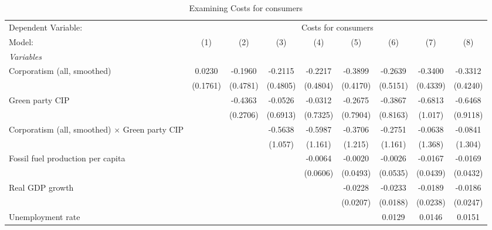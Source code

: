 
\begin{table}[htbp]
   \caption{Examining Costs for consumers}
   \centering
   \begin{tabular}{lcccccccc}
      \tabularnewline \midrule \midrule
      Dependent Variable: & \multicolumn{8}{c}{Costs for consumers}\\
      Model:                                                & (1)      & (2)      & (3)      & (4)      & (5)      & (6)      & (7)      & (8)\\  
      \midrule
      \emph{Variables}\\
      Corporatism (all, smoothed)                           & 0.0230   & -0.1960  & -0.2115  & -0.2217  & -0.3899  & -0.2639  & -0.3400  & -0.3312\\   
                                                            & (0.1761) & (0.4781) & (0.4805) & (0.4804) & (0.4170) & (0.5151) & (0.4339) & (0.4240)\\   
      Green party CIP                                       &          & -0.4363  & -0.0526  & -0.0312  & -0.2675  & -0.3867  & -0.6813  & -0.6468\\   
                                                            &          & (0.2706) & (0.6913) & (0.7325) & (0.7904) & (0.8163) & (1.017)  & (0.9118)\\   
      Corporatism (all, smoothed) $\times$ Green party CIP  &          &          & -0.5638  & -0.5987  & -0.3706  & -0.2751  & -0.0638  & -0.0841\\   
                                                            &          &          & (1.057)  & (1.161)  & (1.215)  & (1.161)  & (1.368)  & (1.304)\\   
      Fossil fuel production per capita                     &          &          &          & -0.0064  & -0.0020  & -0.0026  & -0.0167  & -0.0169\\   
                                                            &          &          &          & (0.0606) & (0.0493) & (0.0535) & (0.0439) & (0.0432)\\   
      Real GDP growth                                       &          &          &          &          & -0.0228  & -0.0233  & -0.0189  & -0.0186\\   
                                                            &          &          &          &          & (0.0207) & (0.0188) & (0.0238) & (0.0247)\\   
      Unemployment rate                                     &          &          &          &          &          & 0.0129   & 0.0146   & 0.0151\\   

\end{tabular}
\end{table}
